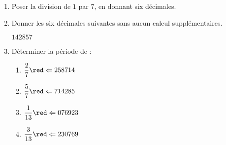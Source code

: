 \begin{corrige}
    \begin{enumerate}
        \item Poser la division de $1$ par $7$, en donnant six décimales.
        
        \item Donner les six décimales suivantes sans aucun calcul supplémentaires.
        
        {\red $142857$}
        \item Déterminer la période de :
        \begin{multicols}{2}
            \begin{spacing}{1.5}
                \begin{enumerate}
                    \item $\dfrac{2}{7}  {\red \Leftarrow 258714}$
                    \item $\dfrac{5}{7}  {\red \Leftarrow 714285}$
                    \item $\dfrac{1}{13} {\red \Leftarrow 076923}$
                    \item $\dfrac{3}{13} {\red \Leftarrow 230769}$
                \end{enumerate}
            \end{spacing}
        \end{multicols}
    \end{enumerate}
\end{corrige}

